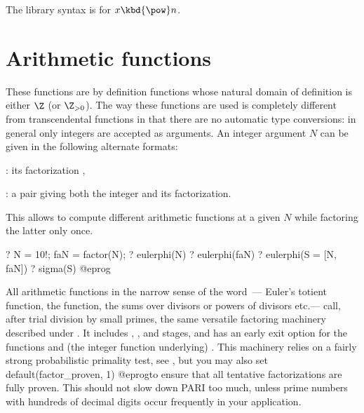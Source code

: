 The library syntax is 
for $x\hbox{\kbd{\pow}}n$.


\section{Arithmetic functions}\label{se:arithmetic}

These functions are by definition functions whose natural domain of
definition is either $\Z$ (or $\Z_{>0}$). The way these functions are used is
completely different from transcendental functions in that there are no
automatic type conversions: in general only integers are accepted as
arguments. An integer argument $N$ can be given in the following alternate
formats:

\item {}: its factorization ,

\item {}: a pair \kbd{[$N$, fa]} giving both the integer and
  its factorization.

This allows to compute different arithmetic functions at a given $N$
while factoring the latter only once.

\bprog
  ? N = 10!; faN = factor(N);
  ? eulerphi(N)
  ? eulerphi(faN)
  ? eulerphi(S = [N, faN])
  ? sigma(S)
@eprog

All arithmetic functions in the narrow sense of the word~--- Euler's
totient function, the  function,
the sums over divisors or powers of divisors etc.--- call, after trial
division by small primes, the same versatile factoring machinery described
under . It includes , ,
 and  stages, and has an early exit option for the
functions  and (the integer function underlying)
. This machinery relies on a fairly strong
probabilistic primality test, see , but you may also set
\bprog
  default(factor_proven, 1)
@eprog\noindent to ensure that all tentative factorizations are fully proven.
This should not slow down PARI too much, unless prime numbers with
hundreds of decimal digits occur frequently in your application.

\label{se:DLfun}


